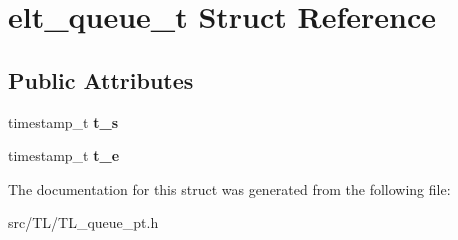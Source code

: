 \hypertarget{structelt__queue__t}{}\section{elt\+\_\+queue\+\_\+t Struct Reference}
\label{structelt__queue__t}
\subsection*{Public Attributes}
\begin{DoxyCompactItemize}
\item 
\mbox{\label{structelt__queue__t_a01bbeb05df02cd77c1edec4a3dc71bb4}} 
timestamp\+\_\+t {\bfseries t\+\_\+s}
\item 
\mbox{\label{structelt__queue__t_a8bb1f74a149c2ae41be5fd3c7432205c}} 
timestamp\+\_\+t {\bfseries t\+\_\+e}
\end{DoxyCompactItemize}


The documentation for this struct was generated from the following file\+:\begin{DoxyCompactItemize}
\item 
src/\+T\+L/T\+L\+\_\+queue\+\_\+pt.\+h\end{DoxyCompactItemize}
